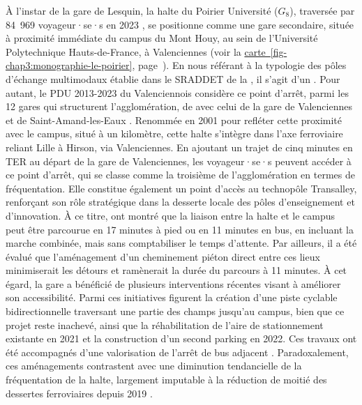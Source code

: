 \begin{refsegment}
À l’instar de la gare de Lesquin, la halte du Poirier Université (\(G_8\)), traversée par 84~969 voyageur·se·s en 2023 \textcolor{blue}{\autocite{sncf_frequentation_2024}}, se positionne comme une gare secondaire, située à proximité immédiate du campus du Mont Houy, au sein de l’Université Polytechnique Hauts-de-France, à Valenciennes (voir la \hyperref[fig-chap3:monographie-le-poirier]{carte~\ref{fig-chap3:monographie-le-poirier}}, page~\pageref{fig-chap3:monographie-le-poirier}). En nous référant à la typologie des pôles d'échange multimodaux établie dans le \acrshort{SRADDET} de la \textcolor{blue}{\textcite[83]{region_hauts-de-france_sraddet_2024}}, il s'agit d'un . Pour autant, le \acrshort{PDU} 2013-2023 du Valenciennois considère ce point d'arrêt, parmi les 12 gares qui structurent l'agglomération, de  avec celui de la gare de Valenciennes et de Saint-Amand-les-Eaux \textcolor{blue}{\autocite[43-44]{siturv_plan_2014}}. Renommée en 2001 pour refléter cette proximité avec le campus, situé à un kilomètre, cette halte s’intègre dans l’axe ferroviaire reliant Lille à Hirson, via Valenciennes. En ajoutant un trajet de cinq minutes en \acrshort{TER} au départ de la gare de Valenciennes, les voyageur·se·s peuvent accéder à ce point d'arrêt, qui se classe comme la troisième de l’agglomération en termes de fréquentation. Elle constitue également un point d’accès au technopôle Transalley, renforçant son rôle stratégique dans la desserte locale des pôles d’enseignement et d’innovation. À ce titre, \textcolor{blue}{\textcite[52]{lhostis_cadencement_2001}} ont montré que la liaison entre la halte et le campus peut être parcourue en 17 minutes à pied ou en 11 minutes en bus, en incluant la marche combinée, mais sans comptabiliser le temps d'attente. Par ailleurs, il a été évalué que l'aménagement d'un cheminement piéton direct entre ces lieux minimiserait les détours et ramènerait la durée du parcours à 11 minutes. À cet égard, la gare a bénéficié de plusieurs interventions récentes visant à améliorer son accessibilité. Parmi ces initiatives figurent la création d’une piste cyclable bidirectionnelle traversant une partie des champs jusqu’au campus, bien que ce projet reste inachevé, ainsi que la réhabilitation de l'aire de stationnement existante en 2021 et la construction d’un second parking en 2022. Ces travaux ont été accompagnés d’une valorisation de l’arrêt de bus adjacent \textcolor{blue}{\autocite{delattre_gros_2020}}. Paradoxalement, ces aménagements contrastent avec une diminution tendancielle de la fréquentation de la halte, largement imputable à la réduction de moitié des dessertes ferroviaires depuis 2019 \textcolor{blue}{\autocite{verdonckt_pourquoi_2023}}.%


\end{refsegment}
